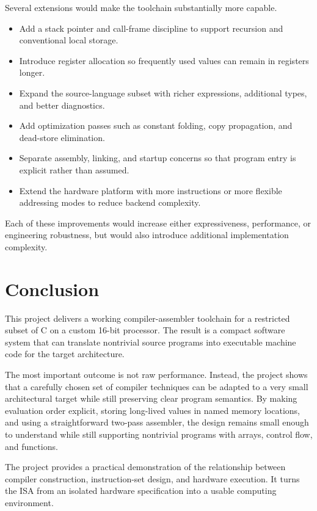 \documentclass[12pt]{report}
\begin{document}
Several extensions would make the toolchain substantially more capable.

\begin{itemize}
    \item Add a stack pointer and call-frame discipline to support recursion and conventional local storage.
    \item Introduce register allocation so frequently used values can remain in registers longer.
    \item Expand the source-language subset with richer expressions, additional types, and better diagnostics.
    \item Add optimization passes such as constant folding, copy propagation, and dead-store elimination.
    \item Separate assembly, linking, and startup concerns so that program entry is explicit rather than assumed.
    \item Extend the hardware platform with more instructions or more flexible addressing modes to reduce backend complexity.
\end{itemize}

Each of these improvements would increase either expressiveness, performance, or
engineering robustness, but would also introduce additional implementation
complexity.

\chapter{Conclusion}

This project delivers a working compiler-assembler toolchain for a restricted
subset of C on a custom 16-bit processor. The result is a compact software
system that can translate nontrivial source programs into executable machine
code for the target architecture.

The most important outcome is not raw performance. Instead, the project shows
that a carefully chosen set of compiler techniques can be adapted to a very
small architectural target while still preserving clear program semantics. By
making evaluation order explicit, storing long-lived values in named memory
locations, and using a straightforward two-pass assembler, the design remains
small enough to understand while still supporting nontrivial programs with
arrays, control flow, and functions.

The project provides a practical demonstration of the relationship between
compiler construction, instruction-set design, and hardware execution. It
turns the ISA from an isolated hardware specification into a usable computing
environment.
\end{document}
